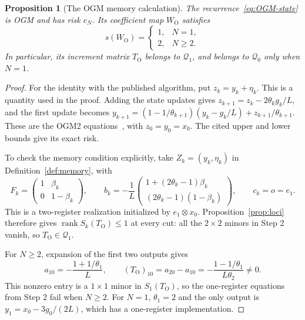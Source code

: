 \documentclass[11pt]{article}
\numberwithin{equation}{section}
\newtheorem{proposition}[theorem]{Proposition}
\theoremstyle{definition}
\newcommand{\Q}{\mathcal Q}
\DeclareMathOperator{\rank}{rank}
\begin{document}
\begin{proposition}[The OGM memory calculation]\label{prop:OGM-memory}
The recurrence~\eqref{eq:OGM-state} is OGM and has risk $c_N$. Its coefficient map $W_{\mathrm O}$ satisfies
\[
 s(W_{\mathrm O})=
 \begin{cases}1,&N=1,\\2,&N\ge2.\end{cases}
\]
In particular, its increment matrix $T_{\mathrm O}$ belongs to $\Q_1$, and belongs to $\Q_0$ only when $N=1$.
\end{proposition}
\begin{proof}
For the identity with the published algorithm, put $z_k=y_k+\eta_k$. This is a quantity used in the proof. Adding the state updates gives
$z_{k+1}=z_k-2\theta_kg_k/L$, and the first update becomes
$y_{k+1}=(1-1/\theta_{k+1})(y_k-g_k/L)+z_{k+1}/\theta_{k+1}$.
These are the OGM2 equations~\cite[Section 7.2]{KF}, with $z_0=y_0=x_0$. The cited upper and lower bounds give its exact risk.

To check the memory condition explicitly, take $Z_k=(y_k,\eta_k)$ in Definition~\ref{def:memory}, with
\[
 F_k=\begin{pmatrix}1&\beta_k\\0&1-\beta_k\end{pmatrix},\qquad
 b_k=-\frac1L
 \begin{pmatrix}1+(2\theta_k-1)\beta_k\\(2\theta_k-1)(1-\beta_k)\end{pmatrix},
 \qquad c_k=o=e_1.
\]
This is a two-register realization initialized by $e_1\otimes x_0$. Proposition~\ref{prop:loci} therefore gives $\rank S_k(T_{\mathrm O})\le1$ at every cut: all the $2\times2$ minors in Step 2 vanish, so $T_{\mathrm O}\in\Q_1$.

For $N\ge2$, expansion of the first two outputs gives
\begin{equation}
 a_{10}=-\frac{1+1/\theta_1}{L},\qquad
 (T_{\mathrm O})_{10}=a_{20}-a_{10}
 =-\frac{1-1/\theta_1}{L\theta_2}\ne0.
 \label{eq:OGM-increment}
\end{equation}
This nonzero entry is a $1\times1$ minor in $S_1(T_{\mathrm O})$, so the one-register equations from Step 2 fail when $N\ge2$. For $N=1$, $\theta_1=2$ and the only output is $y_1=x_0-3g_0/(2L)$, which has a one-register implementation.
\end{proof}
\end{document}
